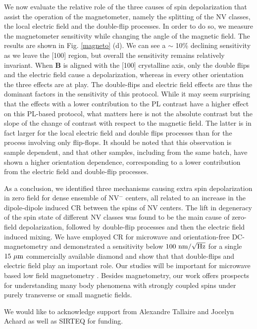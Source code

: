 \documentclass[preprintnumbers,amsmath,amssymb,superscriptaddress,twocolumn,showpacs]{revtex4-2}
\begin{document}
We now evaluate the relative role of the three causes of spin depolarization that assist the operation of the magnetometer, namely the splitting of the NV classes, the local electric field and the double-flip processes. In order to do so, we measure the magnetometer sensitivity while changing the angle of the magnetic field.  The results are shown in Fig. \ref{magneto} (d). We can see a $\sim$ 10\% declining sensitivity as we leave the [100] region, but overall the sensitivity remains relatively invariant. 
When $\bm B$ is aligned with the [100] crystalline axis, only the double flips and the electric field cause a depolarization, whereas in every other orientation the three effects are at play.
The double-flips and electric field effects are thus the dominant factors in the sensitivity of this protocol. While it may seem surprising that the effects with a lower contribution to the PL contrast have a higher effect on this PL-based protocol, what matters here is not the absolute contrast but the slope of the change of contrast with respect to the magnetic field. The latter is in fact larger for the local electric field and double flips processes than for the process involving only flip-flops. 
It should be noted that this observation is sample dependent, and that other samples, including from the same batch, have shown a higher orientation dependence, corresponding to a lower contribution from the electric field and double-flip processes.

As a conclusion, we identified three mechanisms causing extra spin depolarization in zero field for dense ensemble of NV$^-$ centers, all related to an increase in the dipole-dipole induced CR between the spins of NV centers. The lift in degeneracy of the spin state of different NV classes was found to be the main cause of zero-field depolarization, followed by double-flip processes and then the electric field induced mixing. We have employed CR for microwave and orientation-free DC-magnetometry and demonstrated a sensitivity below $100\ \rm{nm}/\sqrt{\rm Hz}$ for a single $15\ \mu \rm m$ commercially available diamond and show that that double-flips and electric field play an important role.
Our studies will be important for microwave based low field magnetometry \cite{Vetter_LFM, WangRB}. 
Besides magnetometry, our work offers prospects for understanding many body phenomena with strongly coupled spins under purely transverse or small magnetic fields. 

\begin{acknowledgments}

We would like to acknowledge support from Alexandre Tallaire and Jocelyn Achard as well as 
SIRTEQ for funding.

\end{acknowledgments}
%

{}
\end{document}
